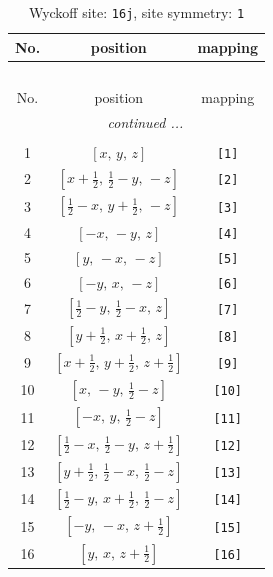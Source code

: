 \documentclass[fleqn,8pt]{jsarticle}
\begin{document}
\begin{longtable}{ccc}
\caption{Wyckoff site: {\tt 16j}, site symmetry: {\tt 1}}
 \\
 \hline \hline
No. & position & mapping \\ \hline \endfirsthead

\multicolumn{2}{l}{\tablename\ \thetable{}} \\
 \hline \hline
No. & position & mapping \\ \hline \endhead

 \hline \hline
\multicolumn{2}{r}{\footnotesize\it continued ...} \\ \endfoot

 \hline \hline
\multicolumn{2}{r}{} \\ \endlastfoot

1 & $\left[ x,\, y,\, z \right]$ & {\tt [1]} \\ \hline
2 & $\left[ x + \frac{1}{2},\, \frac{1}{2} - y,\, - z \right]$ & {\tt [2]} \\ \hline
3 & $\left[ \frac{1}{2} - x,\, y + \frac{1}{2},\, - z \right]$ & {\tt [3]} \\ \hline
4 & $\left[ - x,\, - y,\, z \right]$ & {\tt [4]} \\ \hline
5 & $\left[ y,\, - x,\, - z \right]$ & {\tt [5]} \\ \hline
6 & $\left[ - y,\, x,\, - z \right]$ & {\tt [6]} \\ \hline
7 & $\left[ \frac{1}{2} - y,\, \frac{1}{2} - x,\, z \right]$ & {\tt [7]} \\ \hline
8 & $\left[ y + \frac{1}{2},\, x + \frac{1}{2},\, z \right]$ & {\tt [8]} \\ \hline
9 & $\left[ x + \frac{1}{2},\, y + \frac{1}{2},\, z + \frac{1}{2} \right]$ & {\tt [9]} \\ \hline
10 & $\left[ x,\, - y,\, \frac{1}{2} - z \right]$ & {\tt [10]} \\ \hline
11 & $\left[ - x,\, y,\, \frac{1}{2} - z \right]$ & {\tt [11]} \\ \hline
12 & $\left[ \frac{1}{2} - x,\, \frac{1}{2} - y,\, z + \frac{1}{2} \right]$ & {\tt [12]} \\ \hline
13 & $\left[ y + \frac{1}{2},\, \frac{1}{2} - x,\, \frac{1}{2} - z \right]$ & {\tt [13]} \\ \hline
14 & $\left[ \frac{1}{2} - y,\, x + \frac{1}{2},\, \frac{1}{2} - z \right]$ & {\tt [14]} \\ \hline
15 & $\left[ - y,\, - x,\, z + \frac{1}{2} \right]$ & {\tt [15]} \\ \hline
16 & $\left[ y,\, x,\, z + \frac{1}{2} \right]$ & {\tt [16]} \\
\end{longtable}
\end{document}
